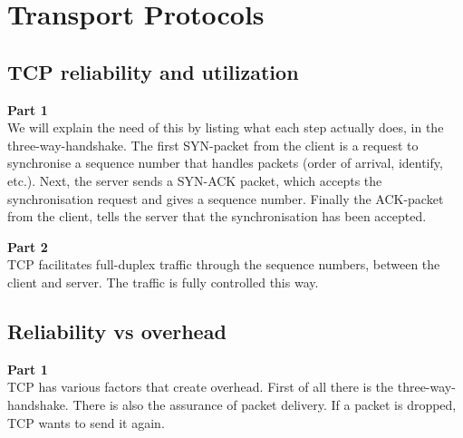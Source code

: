 \section{Transport Protocols}
\subsection{TCP reliability and utilization}
\textbf{Part 1} \\
We will explain the need of this by listing what each step actually does, in the
three-way-handshake. The first SYN-packet from the client is a request to
synchronise a sequence number that handles packets (order of arrival, identify,
etc.). Next, the server sends a SYN-ACK packet, which accepts the synchronisation
request and gives a sequence number. Finally the ACK-packet from the client,
tells the server that the synchronisation has been accepted.

\noindent \textbf{Part 2} \\
TCP facilitates full-duplex traffic through the sequence numbers, between the
client and server. The traffic is fully controlled this way.

\subsection{Reliability vs overhead}
\textbf{Part 1} \\
TCP has various factors that create overhead. First of all there is the
three-way-handshake. There is also the assurance of packet delivery. If a
packet is dropped, TCP wants to send it again.
